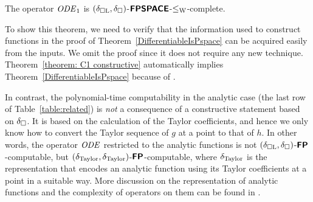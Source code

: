 \begin{theorem}
\label{theorem: C1 constructive}
The operator $\mathit{ODE} _1$ is $(\delta _{\square \mathrm L}, \delta _\square)$-$\text{\bfseries \sffamily \upshape FPSPACE}$-$\leq _{\mathrm W}$-complete.
\end{theorem}

To show this theorem,
we need to verify that the information used to construct functions in the proof of Theorem~\ref{DifferentiableIsPspace}
can be acquired easily from the inputs.
We omit the proof since it does not require any new technique.
Theorem~\ref{theorem: C1 constructive}
automatically implies Theorem~\ref{DifferentiableIsPspace} 
because of \cite[Lemmas 3.7 and 3.8]{kawamura2010operators}. 


In contrast, 
the polynomial-time computability in the analytic case
(the last row of Table~\ref{table:related})
is \emph{not} a consequence of a constructive statement based on $\delta _\square$. 
It is based on the calculation of the Taylor coefficients, 
and hence we only know how 
to convert the Taylor sequence of $g$ at a point to that of $h$. 
In other words, 
the operator $\mathit{ODE}$ restricted to the analytic functions
is not $(\delta _{\square \mathrm L}, \delta _\square)$-$\text{\bfseries \sffamily \upshape FP}$-computable, 
but $(\delta _{\mathrm{Taylor}}, \delta _{\mathrm{Taylor}})$-$\text{\bfseries \sffamily \upshape FP}$-computable, 
where $\delta _{\mathrm{Taylor}}$ is the representation that 
encodes an analytic function using its Taylor coefficients at a point 
in a suitable way. 
More discussion on the representation of analytic functions 
and the complexity of operators on them 
can be found in 
\cite{kawamura12:_unifor_polyt_comput_operat_univar}. 